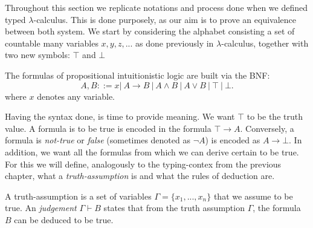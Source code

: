 Throughout this section we replicate notations and process done when we defined typed $\lambda$-calculus. This is done purposely, as our aim is to prove an equivalence between both system. We start by considering the alphabet consisting a set of countable many variables $x,y,z,...$ as done previously in $\lambda$-calculus, together with two new symbols: $\top$ and $\bot$ 

\begin{definition}
  The formulas of propositional intuitionistic logic are built via the BNF:
  $$A,B ::= x |\ A\to B\ |\ A \land B \ |\ A \lor B \ |\ \top \ |\ \bot .$$
  where $x$ denotes any variable.
\end{definition}




Having the syntax done, is time to provide meaning. We want $\top$ to be the truth value. A formula is to be true is encoded in the formula $\top \to A$. Conversely, a formula is \emph{not-true} or \emph{false} (sometimes denoted as $\neg A$) is encoded as $ A \to \bot$. In addition, we want all the formulas from which we can derive certain to be true. For this we will define, analogously to the typing-contex from the previous chapter, what a \emph{truth-assumption} is and  what the rules of deduction are.

\begin{definition}
  A truth-assumption is a set of variables $\Gamma = \{x_1,...,x_n\}$ that we assume to be true. An \emph{judgement} $\Gamma \vdash B$ states that from the truth assumption $\Gamma$, the formula $B$ can be deduced to be true. 
\end{definition}

